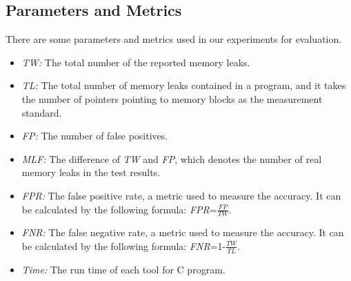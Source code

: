 \subsection{Parameters and Metrics}\label{ssec:pm}
There are some parameters and metrics used in our experiments for evaluation.
\begin{itemize}
\item \textit{TW:} The total number of the reported memory leaks.
\item \textit{TL:} The total number of memory leaks contained in a program, and it takes the number of pointers pointing to memory blocks as the measurement standard.
\item \textit{FP:} The number of false positives.
\item \textit{MLF:} The difference of \textit{TW} and \textit{FP}, which denotes the number of real memory leaks in the test results.
\item \textit{FPR:} The false positive rate, a metric used to measure the accuracy. It can be calculated by the following formula: \textit{FPR}=$\frac{\textit{FP}}{\textit{TW}}$.
\item \textit{FNR:} The false negative rate, a metric used to measure the accuracy. It can be calculated by the following formula: \textit{FNR}=1-$\frac{\textit{TW}}{\textit{TL}}$.
\item \textit{Time:} The run time of each tool for C program.
\end{itemize}